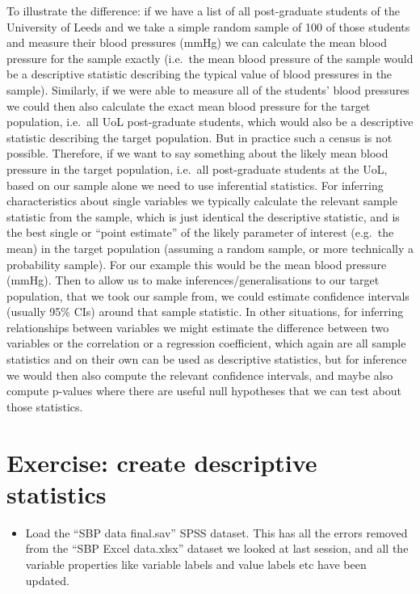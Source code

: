 \documentclass[
]{book}
\providecommand{\tightlist}{%
  \setlength{\itemsep}{0pt}\setlength{\parskip}{0pt}}
\begin{document}
To illustrate the difference: if we have a list of all post-graduate students of the University of Leeds and we take a simple random sample of 100 of those students and measure their blood pressures (mmHg) we can calculate the mean blood pressure for the sample exactly (i.e.~the mean blood pressure of the sample would be a descriptive statistic describing the typical value of blood pressures in the sample). Similarly, if we were able to measure all of the students' blood pressures we could then also calculate the exact mean blood pressure for the target population, i.e.~all UoL post-graduate students, which would also be a descriptive statistic describing the target population. But in practice such a census is not possible. Therefore, if we want to say something about the likely mean blood pressure in the target population, i.e.~all post-graduate students at the UoL, based on our sample alone we need to use inferential statistics. For inferring characteristics about single variables we typically calculate the relevant sample statistic from the sample, which is just identical the descriptive statistic, and is the best single or ``point estimate'' of the likely parameter of interest (e.g.~the mean) in the target population (assuming a random sample, or more technically a probability sample). For our example this would be the mean blood pressure (mmHg). Then to allow us to make inferences/generalisations to our target population, that we took our sample from, we could estimate confidence intervals (usually 95\% CIs) around that sample statistic. In other situations, for inferring relationships between variables we might estimate the difference between two variables or the correlation or a regression coefficient, which again are all sample statistics and on their own can be used as descriptive statistics, but for inference we would then also compute the relevant confidence intervals, and maybe also compute p-values where there are useful null hypotheses that we can test about those statistics.

\hypertarget{exercise-create-descriptive-statistics}{%
\section{Exercise: create descriptive statistics}\label{exercise-create-descriptive-statistics}}

\begin{itemize}
\tightlist
\item
  Load the ``SBP data final.sav'' SPSS dataset. This has all the errors removed from the ``SBP Excel data.xlsx'' dataset we looked at last session, and all the variable properties like variable labels and value labels etc have been updated.
\end{itemize}
\end{document}
